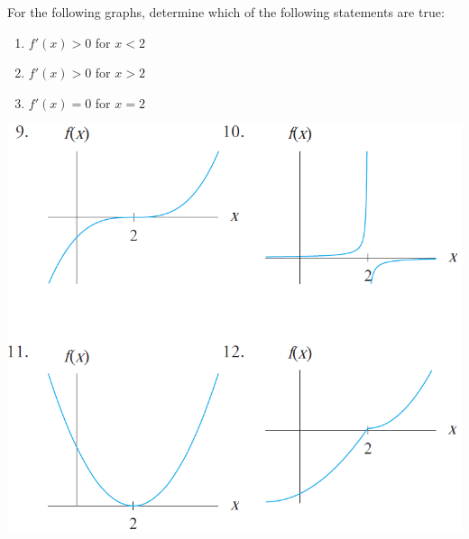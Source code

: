 \documentclass[notes]{subfiles}
\begin{document}
		\begin{ex}
			For the following graphs, determine which of the following statements are true:
			\begin{enumerate}[(1)]
				\item $f'(x) > 0$ for $x < 2$
				\item $f'(x) > 0$ for $x > 2$
				\item $f'(x) = 0$ for $x = 2$
			\end{enumerate}
			\begin{flushleft}
				\includegraphics[scale=.8]{./img/sec42-1.png}
			\end{flushleft}
		\end{ex}
		
	\clearpage
\end{document}
